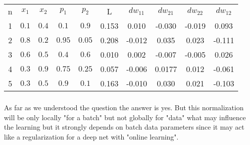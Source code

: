 \documentclass{article}
\begin{document}
\begin{center}
	\begin{tabular}{ |c|c|c|c|c|c|c|c|c|c| } 
		\hline
	n & $x_1$ & $x_2$ & $p_1$ & $p_2$ & L&  $dw_{11}$ & $dw_{21}$ & $dw_{22}$ & $dw_{12}$ \\
	1 & $0.1$ & $0.4$ & $0.1$ & $0.9$ & 0.153&  0.010 & -0.030 & -0.019 & 0.093 \\
	2 & $0.8 $ & $0.2$ & $0.95$ & $0.05$ & 0.208&  -0.012 & 0.035 & 0.023 & -0.111 \\
	3 & $0.6$ & $0.5$ & $0.4$ & $0.6$ & 0.010&  0.002 & -0.007 & -0.005 & 0.026 \\
	4 & $0.3$ & $0.9 $ & $0.75$ & $0.25$ & 0.057&  -0.006 & 0.0177 & 0.012 & -0.061 \\
	5 & $0.3$ & $0.5$ & $0.9$ & $0.1$ & 0.163&  -0.010 & 0.030 & 0.021 & -0.103 \\
		\hline
	\end{tabular}
\end{center}
\subsubsection{}


\subsubsection{}
As far as we understood the question the answer is yes. But this normalization will be only locally "for a batch" but not globally for "data" what may influence the learning but it strongly depends on batch data parameters since it may act like a regularization for a deep net with "online learning". 
\end{document}
